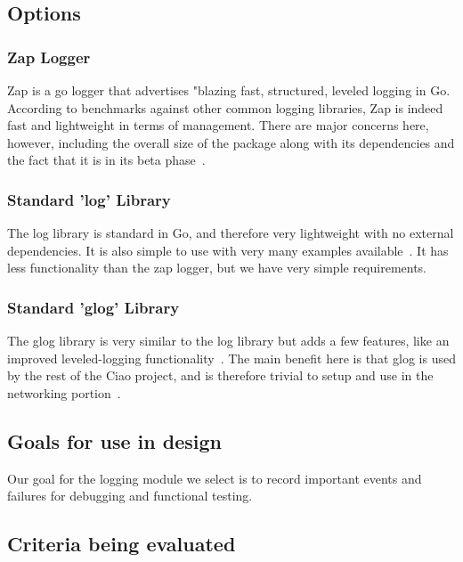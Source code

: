 \documentclass[10pt,letterpaper,onecolumn,journal]{IEEEtran}
\begin{document}
\subsection{Options}

\subsubsection{Zap Logger}

Zap is a go logger that advertises "blazing fast, structured, leveled logging in
Go. According to benchmarks against other common logging libraries, Zap is
indeed fast and lightweight in terms of management. There are major concerns
here, however, including the overall size of the package along with its
dependencies and the fact that it is in its beta phase~\cite{zap}.

\subsubsection{Standard 'log' Library}

The log library is standard in Go, and therefore very lightweight with no
external dependencies. It is also simple to use with very many examples
available~\cite{log}. It has less functionality than the zap logger, but we have
very simple requirements.

\subsubsection{Standard 'glog' Library}

The glog library is very similar to the log library but adds a few features,
like an improved leveled-logging functionality~\cite{glog}. The main benefit
here is that glog is used by the rest of the Ciao project, and is therefore
trivial to setup and use in the networking portion~\cite{ciao}.

\subsection{Goals for use in design}

Our goal for the logging module we select is to record important events and
failures for debugging and functional testing.

\subsection{Criteria being evaluated}
\end{document}
